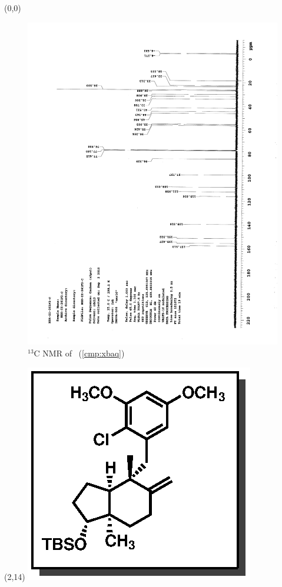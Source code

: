 \clearpage
\begin{textblock}{20}(0,0)
\begin{figure}[htb]
\caption{$^{13}$C NMR of  \CMPxbaq\ (\ref{cmp:xbaq})}
\includegraphics[scale=0.75, trim = 0mm 0mm 0mm 5mm,
clip]{chp_singlecarbon/images/nmr/xbaqC}
\vspace{-100pt}
\end{figure}
\end{textblock}
\begin{textblock}{1}(2,14)
\includegraphics[scale=0.8, angle=90]{chp_singlecarbon/images/xbaq}
\end{textblock}
\clearpage

